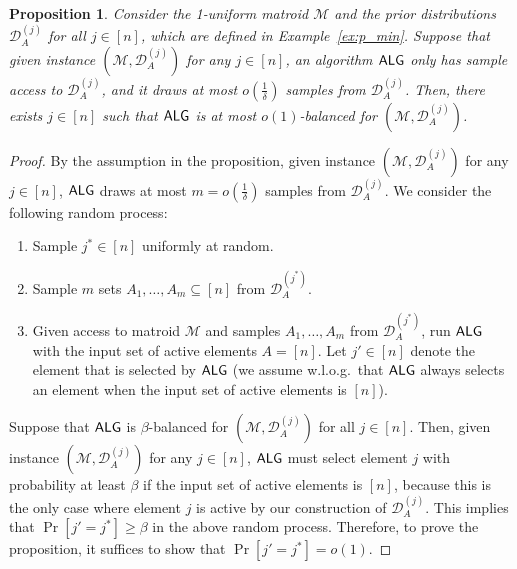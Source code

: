 \documentclass[11pt]{article}
\newcommand{\D}{\mathcal D}
\newcommand{\M}{{\mathcal M}}
\newcommand{\alg}{\textnormal{\sffamily ALG}}
\newtheorem{proposition}{Proposition}[section]
\begin{document}
\begin{proposition}\label{prop:p_min}
Consider the 1-uniform matroid $\M$ and the prior distributions $\D_{A}^{(j)}$ for all $j\in[n]$, which are defined in Example~\ref{ex:p_min}. Suppose that given instance $(\M,\D_A^{(j)})$ for any $j\in[n]$, an algorithm $\alg$ only has sample access to $\D_A^{(j)}$, and it draws at most $o(\frac{1}{\delta})$ samples from $\D_A^{(j)}$. Then, there exists $j\in[n]$ such that $\alg$ is at most $o(1)$-balanced for $(\M,\D_A^{(j)})$.
\end{proposition}
\begin{proof}
By the assumption in the proposition, given instance $(\M,\D_{A}^{(j)})$ for any $j\in[n]$, $\alg$ draws at most $m=o(\frac{1}{\delta})$ samples from $\D_{A}^{(j)}$. We consider the following random process:
\begin{enumerate}[(1)]
    \item Sample $j^*\in[n]$ uniformly at random.
    \item Sample $m$ sets $A_1,\dots,A_m\subseteq[n]$ from $\D_{A}^{(j^*)}$.
    \item Given access to matroid $\M$ and samples $A_1,\dots,A_m$ from $\D_{A}^{(j^*)}$, run $\alg$ with the input set of active elements $A=[n]$. Let $j'\in[n]$ denote the element that is selected by $\alg$ (we assume w.l.o.g.~that $\alg$ always selects an element when the input set of active elements is $[n]$).
\end{enumerate}
Suppose that $\alg$ is $\beta$-balanced for $(\M,\D_A^{(j)})$ for all $j\in[n]$. Then, given instance $(\M,\D_{A}^{(j)})$ for any $j\in[n]$, $\alg$ must select element $j$ with probability at least $\beta$ if the input set of active elements is $[n]$, because this is the only case where element $j$ is active by our construction of $\D_{A}^{(j)}$. This implies that $\Pr[j'=j^*]\ge\beta$ in the above random process. Therefore, to prove the proposition, it suffices to show that $\Pr[j'=j^*]=o(1)$.


\end{proof}
\end{document}

